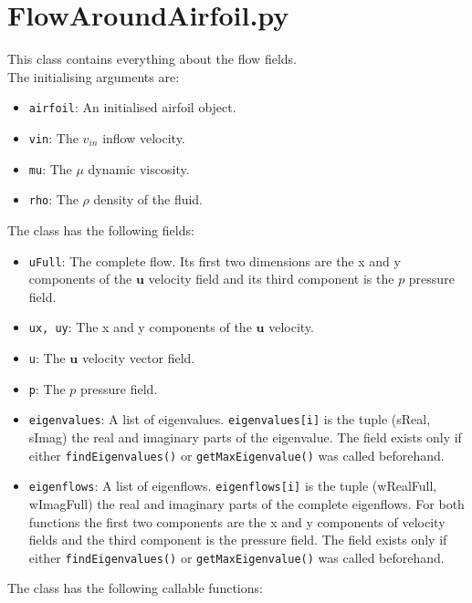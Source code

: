 \documentclass[12pt, a4paper]{article}
\begin{document}
    \section{FlowAroundAirfoil.py}
        This class contains everything about the flow fields. \\
        The initialising arguments are:
        \begin{itemize}
            \item \texttt{airfoil}: An initialised airfoil object.
            \item \texttt{v\textunderscore in}: The $v_{in}$ inflow velocity.
            \item \texttt{mu}: The $\mu$ dynamic viscosity.
            \item \texttt{rho}: The $\rho$ density of the fluid.
        \end{itemize}
        The class has the following fields:
        \begin{itemize}
            \item \texttt{uFull}: The complete flow. Its first two dimensions are the x and y components of the $\mathbf{u}$ velocity field and its third component is the $p$ pressure field.
            \item \texttt{u\textunderscore x, u\textunderscore y}: The x and y components of the $\mathbf{u}$ velocity.
            \item \texttt{u}: The $\mathbf{u}$ velocity vector field.
            \item \texttt{p}: The $p$ pressure field.
            \item \texttt{eigenvalues}: A list of eigenvalues. \texttt{eigenvalues[i]} is the tuple (sReal, sImag) the real and imaginary parts of the eigenvalue. The field exists only if either \texttt{findEigenvalues()} or \texttt{getMaxEigenvalue()} was called beforehand.
            \item \texttt{eigenflows}: A list of eigenflows. \texttt{eigenflows[i]} is the tuple (wRealFull, wImagFull) the real and imaginary parts of the complete eigenflows. For both functions the first two components are the x and y components of velocity fields and the third component is the pressure field. The field exists only if either \texttt{findEigenvalues()} or \texttt{getMaxEigenvalue()} was called beforehand.
        \end{itemize}
        The class has the following callable functions:
\end{document}
